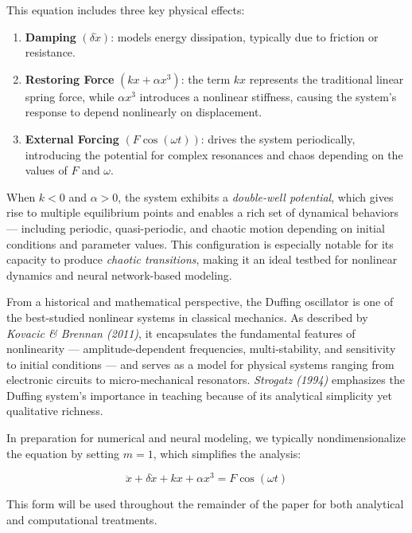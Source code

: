 \documentclass{article}
\begin{document}
This equation includes three key physical effects:
\begin{enumerate}
    \item \textbf{Damping} $(\delta \dot{x})$: models energy dissipation, typically due to friction or resistance.
    \item \textbf{Restoring Force} $(kx + \alpha x^3)$: the term $kx$ represents the traditional linear spring force, while $\alpha x^3$ introduces a nonlinear stiffness, causing the system’s response to depend nonlinearly on displacement.
    \item \textbf{External Forcing} $(F \cos(\omega t))$: drives the system periodically, introducing the potential for complex resonances and chaos depending on the values of $F$ and $\omega$.
\end{enumerate}

When $k < 0$ and $\alpha > 0$, the system exhibits a \textit{double-well potential}, which gives rise to multiple equilibrium points and enables a rich set of dynamical behaviors — including periodic, quasi-periodic, and chaotic motion depending on initial conditions and parameter values. This configuration is especially notable for its capacity to produce \textit{chaotic transitions}, making it an ideal testbed for nonlinear dynamics and neural network-based modeling.


From a historical and mathematical perspective, the Duffing oscillator is one of the best-studied nonlinear systems in classical mechanics. As described by \textit{Kovacic \& Brennan (2011)}, it encapsulates the fundamental features of nonlinearity — amplitude-dependent frequencies, multi-stability, and sensitivity to initial conditions — and serves as a model for physical systems ranging from electronic circuits to micro-mechanical resonators. \textit{Strogatz (1994)} emphasizes the Duffing system’s importance in teaching because of its analytical simplicity yet qualitative richness.

In preparation for numerical and neural modeling, we typically nondimensionalize the equation by setting $m = 1$, which simplifies the analysis:

\begin{equation}
    \ddot{x} + \delta \dot{x} + kx + \alpha x^3 = F \cos(\omega t)
\end{equation}

This form will be used throughout the remainder of the paper for both analytical and computational treatments.
\end{document}
